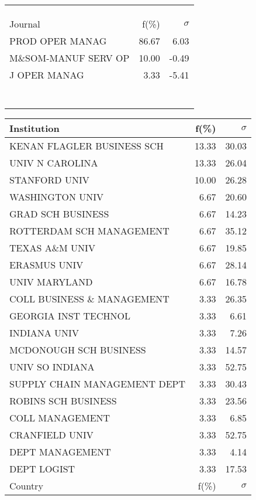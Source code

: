 \documentclass[a4paper,11pt]{report}
\begin{document}
\begin{landscape}
\begin{table}[!ht]
{\begin{tabular}{|l r  r|}
 &  & \\
 &  & \\
 &  & \\
\hline
\hline
Journal & f(\%) & $\sigma$\\
\hline
PROD OPER MANAG & 86.67 & 6.03\\
M\&SOM-MANUF SERV OP & 10.00 & -0.49\\
J OPER MANAG & 3.33 & -5.41\\
 &  & \\
 &  & \\
 &  & \\
 &  & \\
 &  & \\
 &  & \\
 &  & \\
\hline
\end{tabular}
}
{\scriptsize\begin{tabular}{|l r r|}
\hline
Institution & f(\%) & $\sigma$\\
\hline
KENAN FLAGLER BUSINESS SCH & 13.33 & 30.03\\
UNIV N CAROLINA & 13.33 & 26.04\\
STANFORD UNIV & 10.00 & 26.28\\
WASHINGTON UNIV & 6.67 & 20.60\\
GRAD SCH BUSINESS & 6.67 & 14.23\\
ROTTERDAM SCH MANAGEMENT & 6.67 & 35.12\\
TEXAS A\&M UNIV & 6.67 & 19.85\\
ERASMUS UNIV & 6.67 & 28.14\\
UNIV MARYLAND & 6.67 & 16.78\\
COLL BUSINESS \& MANAGEMENT & 3.33 & 26.35\\
GEORGIA INST TECHNOL & 3.33 & 6.61\\
INDIANA UNIV & 3.33 & 7.26\\
MCDONOUGH SCH BUSINESS & 3.33 & 14.57\\
UNIV SO INDIANA & 3.33 & 52.75\\
SUPPLY CHAIN MANAGEMENT DEPT & 3.33 & 30.43\\
ROBINS SCH BUSINESS & 3.33 & 23.56\\
COLL MANAGEMENT & 3.33 & 6.85\\
CRANFIELD UNIV & 3.33 & 52.75\\
DEPT MANAGEMENT & 3.33 & 4.14\\
DEPT LOGIST & 3.33 & 17.53\\
\hline
\hline
Country & f(\%) & $\sigma$\\

\end{tabular}}
\end{table}
\end{landscape}
\end{document}
